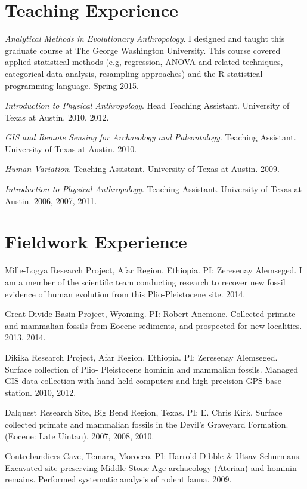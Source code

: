 \documentclass{article}
\begin{document}
\section*{Teaching Experience}
\begin{description*}
\item[] \emph{Analytical Methods in Evolutionary Anthropology}. I designed and taught this graduate course at The George Washington University. This course covered applied statistical methods (e.g, regression, ANOVA and related techniques, categorical data analysis, resampling approaches) and the R statistical programming language. Spring 2015.

\item[] \emph{Introduction to Physical Anthropology}. Head Teaching Assistant. University of Texas at Austin. 2010, 2012.

\item[] \emph{GIS and Remote Sensing for Archaeology and Paleontology}. Teaching Assistant.  University of Texas at Austin. 2010.

\item[] \emph{Human Variation}. Teaching Assistant. University of Texas at Austin. 2009.

\item[] \emph{Introduction to Physical Anthropology}. Teaching Assistant. University of Texas at Austin. 2006, 2007, 2011.
\end{description*}

\section*{Fieldwork Experience}
\begin{description*}
\item[] Mille-Logya Research Project, Afar Region, Ethiopia. PI: Zeresenay Alemseged. I am a member of the scientific team conducting research to recover new fossil evidence of human evolution from this Plio-Pleistocene site. 2014.

\item[] Great Divide Basin Project, Wyoming. PI: Robert Anemone. Collected primate and mammalian fossils from Eocene sediments, and prospected for new localities. 2013, 2014.

\item[] Dikika Research Project, Afar Region, Ethiopia. PI: Zeresenay Alemseged. Surface collection of Plio- Pleistocene hominin and mammalian fossils. Managed GIS data collection with hand-held computers and high-precision GPS base station. 2010, 2012.

\item[] Dalquest Research Site, Big Bend Region, Texas. PI: E. Chris Kirk. Surface collected primate and mammalian fossils in the Devil's Graveyard Formation. (Eocene: Late Uintan). 2007, 2008, 2010.

\item[] Contrebandiers Cave, Temara, Morocco. PI: Harrold Dibble \& Utsav Schurmans. Excavated site preserving Middle Stone Age archaeology (Aterian) and hominin remains. Performed systematic analysis of rodent fauna. 2009.
\end{description*}
\end{document}
